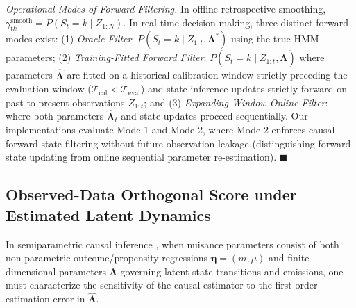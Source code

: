 \documentclass[twoside]{article}
\theoremstyle{definition}
\begin{document}
\textit{Operational Modes of Forward Filtering.} In offline retrospective smoothing, $\gamma_{tk}^{\mathrm{smooth}} = P(S_t = k \mid Z_{1:N})$. In real-time decision making, three distinct forward modes exist: (1) \emph{Oracle Filter}: $P(S_t = k \mid Z_{1:t}, \boldsymbol{\Lambda}^*)$ using the true HMM parameters; (2) \emph{Training-Fitted Forward Filter}: $P(S_t = k \mid Z_{1:t}, \hat{\boldsymbol{\Lambda}})$ where parameters $\hat{\boldsymbol{\Lambda}}$ are fitted on a historical calibration window strictly preceding the evaluation window ($\mathcal{T}_{\mathrm{cal}} < \mathcal{T}_{\mathrm{eval}}$) and state inference updates strictly forward on past-to-present observations $Z_{1:t}$; and (3) \emph{Expanding-Window Online Filter}: where both parameters $\hat{\boldsymbol{\Lambda}}_t$ and state updates proceed sequentially. Our implementations evaluate Mode 1 and Mode 2, where Mode 2 enforces causal forward state filtering without future observation leakage (distinguishing forward state updating from online sequential parameter re-estimation). $\blacksquare$

\subsection{Observed-Data Orthogonal Score under Estimated Latent Dynamics}
\label{app:observed_data_score}
In semiparametric causal inference \citep{chernozhukov2018double, bickel1993efficient}, when nuisance parameters consist of both non-parametric outcome/propensity regressions $\boldsymbol{\eta} = (m, \mu)$ and finite-dimensional parameters $\boldsymbol{\Lambda}$ governing latent state transitions and emissions, one must characterize the sensitivity of the causal estimator to the first-order estimation error in $\hat{\boldsymbol{\Lambda}}$.
\end{document}
